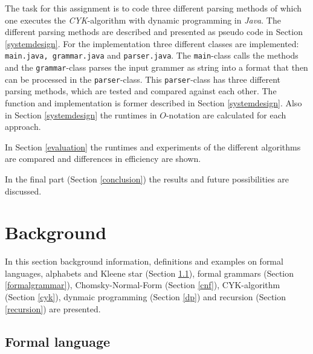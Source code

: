 \documentclass[a4paper, 11pt]{article}
\begin{document}
The task for this assignment is to code three different parsing methods of which one executes the \textit{CYK}-algorithm with dynamic programming in \textit{Java}. The different parsing methods are described and presented as pseudo code in Section \ref{systemdesign}.
For the implementation three different classes are implemented: \texttt{main.java, grammar.java} and \texttt{parser.java}. The \texttt{main}-class calls the methods and the \texttt{grammar}-class parses the input grammer as string into a format that then can be processed in the \texttt{parser}-class. This \texttt{parser}-class has three different parsing methods, which are tested and compared against each other.
The function and implementation is former described in Section \ref{systemdesign}. Also in Section \ref{systemdesign} the runtimes in $O$-notation are calculated for each approach.


In Section \ref{evaluation} the runtimes and experiments of the different algorithms are compared and differences in efficiency are shown.

In the final part (Section \ref{conclusion}) the results and future possibilities are discussed.




\pagebreak














\section{Background}

In this section background information, definitions and examples on formal languages, alphabets and Kleene star (Section \ref{formallanguage}), formal grammars (Section \ref{formalgrammar}), Chomsky-Normal-Form (Section \ref{cnf}), CYK-algorithm (Section \ref{cyk}), dynmaic programming (Section \ref{dp}) and recursion (Section \ref{recursion}) are presented. 


\subsection{Formal language}
\label{formallanguage}
\end{document}
